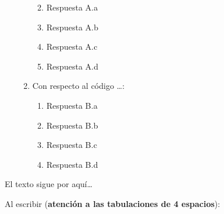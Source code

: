 \documentclass[
  letterpaper,
  DIV=11,
  numbers=noendperiod]{scrartcl}
\providecommand{\tightlist}{%
  \setlength{\itemsep}{0pt}\setlength{\parskip}{0pt}}\usepackage{longtable,booktabs,array}
\begin{document}
\begin{enumerate}
\begin{enumerate}
    \begin{enumerate}
    \def\labelenumiii{\alph{enumiii}.}
    \tightlist
    \item
      Respuesta A.a
    \item
      Respuesta A.b
    \item
      Respuesta A.c
    \item
      Respuesta A.d
    \end{enumerate}
  \item
    Con respecto al código \ldots:

    \begin{enumerate}
    \def\labelenumiii{\alph{enumiii}.}
    \tightlist
    \item
      Respuesta B.a
    \item
      Respuesta B.b
    \item
      Respuesta B.c
    \item
      Respuesta B.d
    \end{enumerate}
  \end{enumerate}
\end{enumerate}

El texto sigue por aquí\ldots{}

Al escribir (\textbf{atención a las tabulaciones de 4 espacios}):
\end{document}
